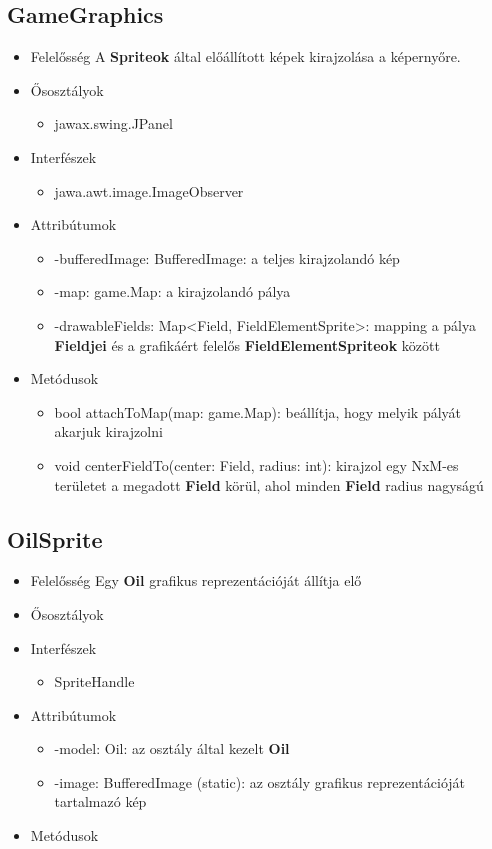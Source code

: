 \subsection{GameGraphics}
\begin{itemize}
\item Felelősség \newline
    A \textbf{Spriteok} által előállított képek kirajzolása a képernyőre.
\item Ősosztályok
    \begin{itemize}
        \item jawax.swing.JPanel
    \end{itemize}
\item Interfészek
    \begin{itemize}
        \item jawa.awt.image.ImageObserver
    \end{itemize}
\item Attribútumok
    \begin{itemize}
        \item -bufferedImage: BufferedImage: a teljes kirajzolandó kép
        \item -map: game.Map: a kirajzolandó pálya
        \item -drawableFields: Map<Field, FieldElementSprite>: mapping a pálya \textbf{Fieldjei} és a grafikáért felelős \textbf{FieldElementSpriteok} között
    \end{itemize}
\item Metódusok
	\begin{itemize}
        \item bool attachToMap(map: game.Map): beállítja, hogy melyik pályát akarjuk kirajzolni
        \item void centerFieldTo(center: Field, radius: int): kirajzol egy NxM-es területet a megadott \textbf{Field} körül, ahol minden \textbf{Field} radius nagyságú
	\end{itemize}
\end{itemize}

\subsection{OilSprite}
\begin{itemize}
\item Felelősség \newline
    Egy \textbf{Oil} grafikus reprezentációját állítja elő
\item Ősosztályok
\item Interfészek
    \begin{itemize}
        \item SpriteHandle
    \end{itemize}
\item Attribútumok
    \begin{itemize}
        \item -model: Oil: az osztály által kezelt \textbf{Oil}
        \item -image: BufferedImage (static): az osztály grafikus reprezentációját tartalmazó kép
    \end{itemize}
\item Metódusok
\end{itemize}

